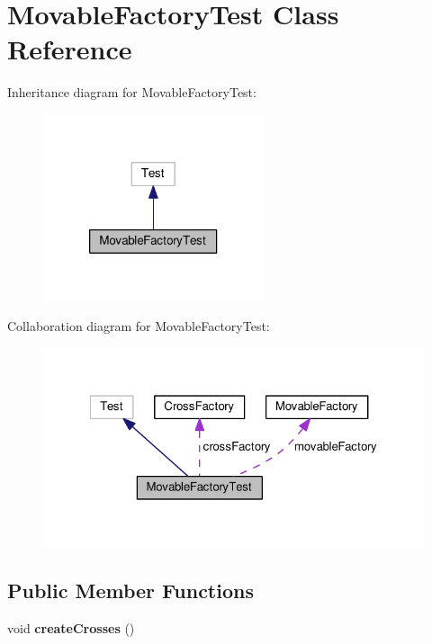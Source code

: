 \hypertarget{classMovableFactoryTest}{\section{Movable\-Factory\-Test Class Reference}
\label{classMovableFactoryTest}
}


Inheritance diagram for Movable\-Factory\-Test\-:
\nopagebreak
\begin{figure}[H]
\begin{center}
\leavevmode
\includegraphics[width=184pt]{classMovableFactoryTest__inherit__graph}
\end{center}
\end{figure}


Collaboration diagram for Movable\-Factory\-Test\-:
\nopagebreak
\begin{figure}[H]
\begin{center}
\leavevmode
\includegraphics[width=322pt]{classMovableFactoryTest__coll__graph}
\end{center}
\end{figure}
\subsection*{Public Member Functions}
\begin{DoxyCompactItemize}
\item 
\hypertarget{classMovableFactoryTest_ac204d112e5b47b9de00e0a349fef3c90}{void {\bfseries create\-Crosses} ()}\label{classMovableFactoryTest_ac204d112e5b47b9de00e0a349fef3c90}

\end{DoxyCompactItemize}
